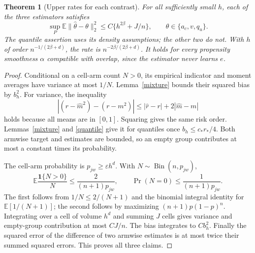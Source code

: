 \documentclass[11pt]{article}
\newtheorem{theorem}{Theorem}
\theoremstyle{remark}
\newcommand{\E}{\mathbb E}
\newcommand{\Ind}{\mathbf 1}
\begin{document}
\begin{theorem}[Upper rates for each contrast]\label{upper}
For all sufficiently small $h$, each of the three estimators satisfies
\[
 \sup_P\E\|\widehat\theta-\theta\|_2^2
                  \leq C\{h^{2\beta}+J/n\},
 \qquad \theta\in\{a_c,v,q_u\}.
\]
The quantile assertion uses its density assumptions; the other two do not. With $h$ of order $n^{-1/(2\beta+d)}$, the rate is $n^{-2\beta/(2\beta+d)}$. It holds for every propensity smoothness $\alpha$ compatible with overlap, since the estimator never learns $e$.
\end{theorem}
\begin{proof}
Conditional on a cell-arm count $N>0$, its empirical indicator and moment averages have variance at most $1/N$. Lemma~\ref{mixture} bounds their squared bias by $b_h^2$. For variance, the inequality
\[
 |(\widehat r-\widehat m^2)-(r-m^2)|
       \leq|\widehat r-r|+2|\widehat m-m|
\]
holds because all means are in $[0,1]$. Squaring gives the same risk order. Lemmas~\ref{mixture} and \ref{quantile} give it for quantiles once $b_h\leq c_*r_*/4$. Both armwise target and estimates are bounded, so an empty group contributes at most a constant times its probability.

The cell-arm probability is $p_{jw}\geq\varepsilon h^d$. With $N\sim\operatorname{Bin}(n,p_{jw})$,
\[
 \E\frac{\Ind\{N>0\}}N\leq\frac2{(n+1)p_{jw}},\qquad
 \Pr(N=0)\leq\frac1{(n+1)p_{jw}}.
\]
The first follows from $1/N\leq2/(N+1)$ and the binomial integral identity for $\E[1/(N+1)]$; the second follows by maximizing $(n+1)p(1-p)^n$. Integrating over a cell of volume $h^d$ and summing $J$ cells gives variance and empty-group contribution at most $CJ/n$. The bias integrates to $Cb_h^2$. Finally the squared error of the difference of two armwise estimates is at most twice their summed squared errors. This proves all three claims.
\end{proof}
\end{document}
